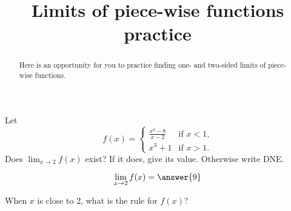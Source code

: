 \documentclass[handout]{ximera}
\title[Exercises:]{Limits of piece-wise functions practice}
\begin{document}
\begin{abstract}
Here is an opportunity for you to practice finding one- and two-sided limits of piece-wise functions.
\end{abstract}
\maketitle

\begin{exercise}
Let
\[
f(x) = \begin{cases}
  \frac{x^3 - 8}{x-2}  &\text{if $x<1$,} \\
  x^3+1 &\text{if  $x>1$.}
\end{cases}
\]
Does $\displaystyle\lim_{x \to 2} f(x)$ exist?  If it does, give its value.
Otherwise write DNE.

\[
\lim_{x \to 2} f(x) = \answer{9}
\]

\begin{hint}
When $x$ is close to 2, what is the rule for $f(x)$?
\end{hint}

\end{exercise}
\end{document}
